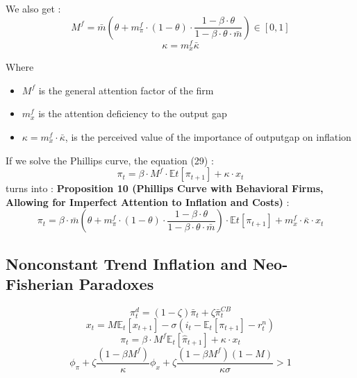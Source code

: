 \documentclass{beamer}
\begin{document}
\begin{frame}{\subsecname}
    We also get : 
    \begin{equation*}
        M^{f}=\bar{m}\left(\theta+m^{f}_{\pi}\cdot(1-\theta)\cdot\frac{1-\beta\cdot\theta}{1-\beta\cdot\theta\cdot\bar{m}}\right)\in\left[0,1\right]
    \end{equation*}
    \begin{equation}\tag{58}
        \kappa = m^{f}_{x}\bar{\kappa}
    \end{equation}

    Where 
    \begin{itemize}
        \item $M^{f}$ is the general attention factor of the firm
        \item $m^{f}_{x}$ is the attention deficiency to the output gap
        \item $\kappa=m_{x}^{f}\cdot\bar{\kappa}$, is the perceived value of the importance of outputgap on inflation
    \end{itemize}
\end{frame}

\begin{frame}{\subsecname}
    If we solve the Phillips curve, the equation (29) : 
    \begin{equation}\tag{29}
        \pi_{t}=\beta\cdot M^{f}\cdot\mathbb{E}t\left[\pi_{t+1}\right]+\kappa\cdot x_{t}
    \end{equation}
    turns into : 
    \textbf{Proposition 10 (Phillips Curve with Behavioral Firms, Allowing for Imperfect Attention to Inflation and Costs)} : 
    \begin{equation*}
        \pi_{t}=\beta\cdot\bar{m}\left(\theta+m^{f}_{\pi}\cdot(1-\theta)\cdot\frac{1-\beta\cdot\theta}{1-\beta\cdot\theta\cdot\bar{m}}\right)\cdot\mathbb{E}t\left[\pi_{t+1}\right]+m_{x}^{f}\cdot\bar{\kappa}\cdot x_{t}
    \end{equation*}
\end{frame}

\subsection{Nonconstant Trend Inflation and Neo- Fisherian Paradoxes}
\begin{frame}{\subsecname}
    \begin{equation}\tag{59}
        \pi^{d}_{t}=(1-\zeta)\bar{\pi}_{t}+\zeta\bar{\pi}_{t}^{CB}
    \end{equation}
    \begin{equation}\tag{60}
        x_{t}=M\mathbb{E}_{t}\left[x_{t+1}\right]-\sigma\left(i_{t}-\mathbb{E}_{t}\left[\pi_{t+1}\right]-r^{n}_{t}\right)
    \end{equation}
    \begin{equation}\tag{61}
        \pi_{t}=\beta\cdot M^{f} \mathbb{E}_t\left[\hat{\pi}_{t+1}\right]+\kappa\cdot x_{t}
    \end{equation}
    \begin{equation}\tag{62}
        \phi_{\pi}+\zeta \frac{(1-\beta M^{f})}{\kappa}\phi_{x}+\zeta\frac{(1-\beta M^{f})(1-M)}{\kappa \sigma}>1
    \end{equation}
\end{frame}
\end{document}
